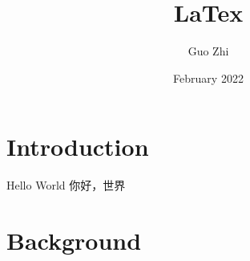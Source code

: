 \documentclass[twocolumn]{article}
\title{LaTex}
\author{Guo Zhi}
\date{February 2022}
\begin{document}
\begin{CJK}{UTF8}{gbsn}

\maketitle

\newpage

\section{Introduction}

Hello World
你好，世界

\section{Background}




\end{CJK}
\end{document}
